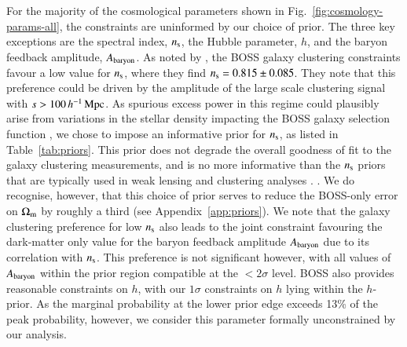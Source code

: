 For the majority of the cosmological parameters shown in Fig.~\ref{fig:cosmology-params-all}, the constraints are uninformed by our choice of prior.  
The three key exceptions are the spectral index, $n_{\rm s}$, the Hubble parameter, $h$, and the baryon feedback amplitude, $A_{\rm baryon}$.  
As noted by \citet{troester/etal:2020}, the BOSS galaxy clustering constraints favour a low value for $n_{\rm s}$, where they find $n_{\rm s} = 0.815 \pm 0.085$. 
They note that this preference could be driven by the amplitude of the large scale clustering signal with $s > 100 \, h^{-1}\, {\rm Mpc}$. 
As spurious excess power in this regime could plausibly arise from variations in the stellar density impacting the BOSS galaxy selection function \citep{ross/etal:2017}, we chose to impose an informative prior for $n_{\rm s}$, as listed in Table~\ref{tab:priors}.  
This prior does not degrade the overall goodness of fit to the galaxy clustering measurements, and is no more informative than the $n_{\rm s}$ priors that are typically used in weak lensing and clustering analyses \citep[see for example][]{abbott/etal:2018}. .
We do recognise, however, that this choice of prior serves to reduce the BOSS-only error on $\Omega_{\rm m}$ by roughly a third (see Appendix~\ref{app:priors}). 
We note that the galaxy clustering preference for low $n_{\rm s}$ also leads to the joint \tttp constraint favouring the dark-matter only value for the baryon feedback amplitude $A_{\rm baryon}$ due to its correlation with $n_{\rm s}$.
This preference is not significant however, with all values of $A_{\rm baryon}$ within the prior region compatible at the $<2 \sigma$ level.  
BOSS also provides reasonable constraints on $h$, with our $1\sigma$ constraints on $h$ lying within the $h$-prior.   As the marginal probability at the lower prior edge exceeds 13\% of the peak probability, however, we consider this parameter formally unconstrained by our analysis. 

